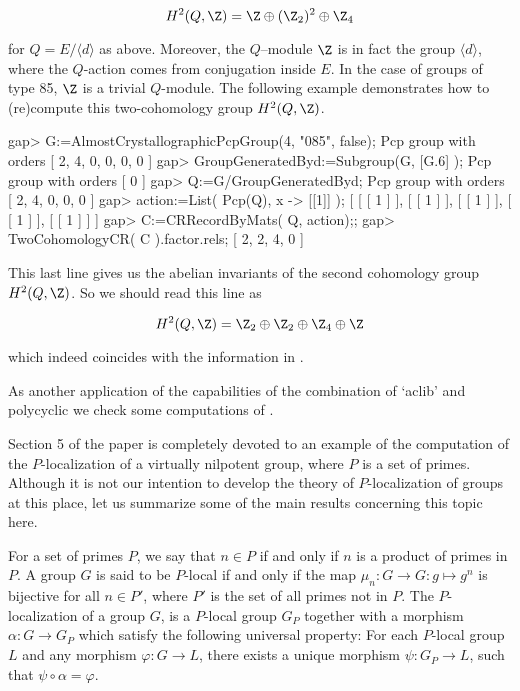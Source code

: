 $$
H^2(Q,\Z) = \Z \oplus (\Z_2)^2 \oplus \Z_4
$$

for $Q=E/\langle d \rangle$ as above. Moreover, the $Q$--module $\Z$ is 
in fact the group $\langle d \rangle$, where the $Q$-action comes from 
conjugation inside $E$. In the case of groups of type 85, $\Z$ is a 
trivial $Q$-module. The following example demonstrates how to (re)compute 
this two-cohomology group $H^2(Q,\Z)$. 

\beginexample
gap> G:=AlmostCrystallographicPcpGroup(4, "085", false);
Pcp group with orders [ 2, 4, 0, 0, 0, 0 ]
gap> GroupGeneratedByd:=Subgroup(G, [G.6] );
Pcp group with orders [ 0 ]
gap> Q:=G/GroupGeneratedByd;
Pcp group with orders [ 2, 4, 0, 0, 0 ]
gap> action:=List( Pcp(Q), x -> [[1]] );
[ [ [ 1 ] ], [ [ 1 ] ], [ [ 1 ] ], [ [ 1 ] ], [ [ 1 ] ] ]
gap> C:=CRRecordByMats( Q, action);;
gap> TwoCohomologyCR( C ).factor.rels;
[ 2, 2, 4, 0 ]
\endexample

This last line gives us the abelian invariants of the second 
cohomology group $H^2(Q,\Z)$. So we should read this line as 

$$
H^2(Q,\Z) = \Z_2 \oplus \Z_2 \oplus \Z_4 \oplus \Z
$$

which indeed coincides with the information in \cite{KD}.


As another application of the capabilities of the combination of
`aclib' and {\sf polycyclic} we check some computations of \cite{DM}.

Section 5 of the paper \cite{DM} is completely devoted to an example
of the computation of the $P$-localization of a virtually nilpotent group,
where $P$ is a set of primes. Although it is not our intention to 
develop the theory of $P$-localization of groups at this place, let us
summarize some of the main results concerning this topic here.

For a set of primes $P$, we say that $n \in P$ if and only if $n$ is
a product of primes in $P$. A group $G$ is said to be $P$-local if and 
only if the map $\mu_n:G\rightarrow G: g \mapsto g^n$ is bijective for 
all $n \in P'$, where $P'$ is the set of all primes not in $P$. The 
$P$-localization of a group $G$, is a $P$-local group $G_P$ together 
with a morphism $\alpha :G \rightarrow G_P$ which satisfy the following 
universal property: For each $P$-local group $L$ and any morphism 
$\varphi: G \rightarrow L$, there exists a unique morphism $\psi:G_P 
\rightarrow L$, such that $\psi \circ \alpha = \varphi$.

